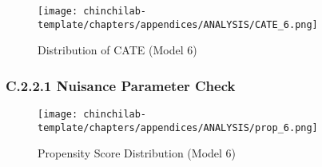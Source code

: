 \begin{figure}[H]
    \centering
    \texttt{[image: chinchilab-template/chapters/appendices/ANALYSIS/CATE\_6.png]}
    \caption{Distribution of CATE (Model 6)}
    \label{fig:my_label}
\end{figure}

\subsubsection{C.2.2.1 Nuisance Parameter Check}
\begin{figure}[H]
    \centering
    \texttt{[image: chinchilab-template/chapters/appendices/ANALYSIS/prop\_6.png]}
    \caption{Propensity Score Distribution (Model 6)}
    \label{fig:my_label}
\end{figure}


